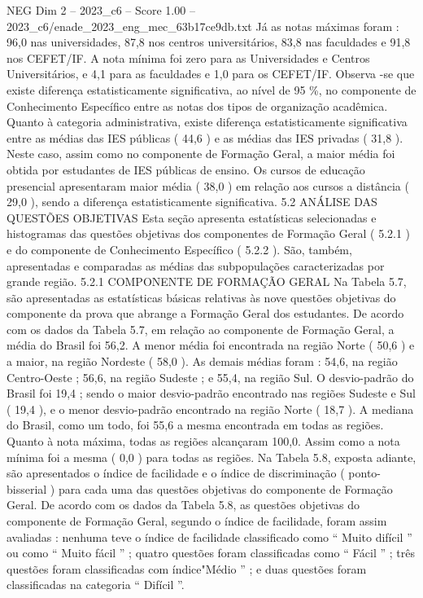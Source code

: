 \begin{textsample}{NEG Dim 2 – 2023\_c6 – Score 1.00 – 2023\_c6/enade\_2023\_eng\_mec\_63b17ce9db.txt}
Já as notas máximas foram : 96,0 nas universidades, 87,8 nos centros universitários, 83,8 nas faculdades e 91,8 nos CEFET/IF.
A nota mínima foi zero para as Universidades e Centros Universitários, e 4,1 para as faculdades e 1,0 para os CEFET/IF.
Observa -se que existe diferença estatisticamente significativa, ao nível de 95 \%, no componente de Conhecimento Específico entre as notas dos tipos de organização acadêmica.
Quanto à categoria administrativa, existe diferença estatisticamente significativa entre as médias das IES públicas ( 44,6 ) e as médias das IES privadas ( 31,8 ).
Neste caso, assim como no componente de Formação Geral, a maior média foi obtida por estudantes de IES públicas de ensino.
Os cursos de educação presencial apresentaram maior média ( 38,0 ) em relação aos cursos a distância ( 29,0 ), sendo a diferença estatisticamente significativa. 5.2 ANÁLISE DAS QUESTÕES OBJETIVAS Esta seção apresenta estatísticas selecionadas e histogramas das questões objetivas dos componentes de Formação Geral ( 5.2.1 ) e do componente de Conhecimento Específico ( 5.2.2 ).
São, também, apresentadas e comparadas as médias das subpopulações caracterizadas por grande região. 5.2.1 COMPONENTE DE FORMAÇÃO GERAL Na Tabela 5.7, são apresentadas as estatísticas básicas relativas às nove questões objetivas do componente da prova que abrange a Formação Geral dos estudantes.
De acordo com os dados da Tabela 5.7, em relação ao componente de Formação Geral, a média do Brasil foi 56,2.
A menor média foi encontrada na região Norte ( 50,6 ) e a maior, na região Nordeste ( 58,0 ).
As demais médias foram : 54,6, na região Centro-Oeste ; 56,6, na região Sudeste ; e 55,4, na região Sul.
O desvio-padrão do Brasil foi 19,4 ; sendo o maior desvio-padrão encontrado nas regiões Sudeste e Sul ( 19,4 ), e o menor desvio-padrão encontrado na região Norte ( 18,7 ).
A mediana do Brasil, como um todo, foi 55,6 a mesma encontrada em todas as regiões.
Quanto à nota máxima, todas as regiões alcançaram 100,0.
Assim como a nota mínima foi a mesma ( 0,0 ) para todas as regiões.
Na Tabela 5.8, exposta adiante, são apresentados o índice de facilidade e o índice de discriminação ( ponto-bisserial ) para cada uma das questões objetivas do componente de Formação Geral.
De acordo com os dados da Tabela 5.8, as questões objetivas do componente de Formação Geral, segundo o índice de facilidade, foram assim avaliadas : nenhuma teve o índice de facilidade classificado como “ Muito difícil ” ou como “ Muito fácil ” ; quatro questões foram classificadas como “ Fácil ” ; três questões foram classificadas com índice"Médio ” ; e duas questões foram classificadas na categoria “ Difícil ”.

\end{textsample}
